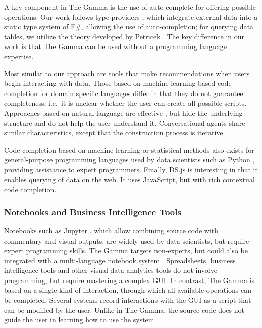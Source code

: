 \documentclass[manuscript,review,anonymous]{acmart}
\begin{document}
A key component in The Gamma is the use of auto-complete for offering possible operations.
Our work follows type providers \cite{inforich,fsdata}, which integrate external data into a
static type system of F\#, allowing the use of auto-completion; for querying data tables, we utilize
the theory developed by Petricek \cite{dotdriven}. The key difference in our work is that The Gamma
can be used without a programming language expertise.

Most similar to our approach are tools that make recommendations when users begin interacting
with data. Those based on machine learning-based code completion for domain specific languages \cite{predictive,proactive}
differ in that they do not guarantee completeness, i.e.~it is unclear whether the user can create all possible
scripts. Approaches based on natural language are effective \cite{eviza,codemend}, but hide the
underlying structure and do not help the user understand it. Conversational agents \cite{iris}
share similar characteristics, except that the construction process is iterative.

Code completion based on machine learning or statistical
methods \cite{mlcomplete,statcomplete} also exists for general-purpose programming languages used
by data scientists such as Python \cite{pythia}, providing assistance to expert programmers.
Finally, DS.js \cite{dsjs} is interesting in that it enables querying of data on the
web. It uses JavaScript, but with rich contextual code completion.

\subsubsection*{Notebooks and Business Intelligence Tools}

Notebooks such as Jupyter \cite{jupyter}, which allow combining source code with commentary and
visual outputs, are widely used by data scientists, but require expert programming skills.
The Gamma targets non-experts, but could also be integrated with a multi-language notebook system
\cite{wrattler}.
%
Spreadsheets, business intelligence tools \cite{tableau,powerbi} and other visual data analytics
tools \cite{control,vizdom} do not involve programming, but require mastering a complex GUI.
In contrast, The Gamma is based on a single kind of interaction, through which all available operations
can be completed. Several systems \cite{potter,wrangler,lyra} record interactions with the GUI
as a script that can be modified by the user. Unlike in The Gamma, the source code does not
guide the user in learning how to use the system.
\end{document}
